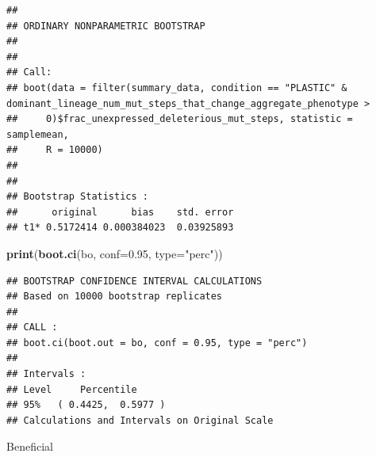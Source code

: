 \documentclass[]{book}
\newenvironment{Shaded}{\begin{snugshade}}{\end{snugshade}}
\newcommand{\DataTypeTok}[1]{\textcolor[rgb]{0.13,0.29,0.53}{#1}}
\newcommand{\DecValTok}[1]{\textcolor[rgb]{0.00,0.00,0.81}{#1}}
\newcommand{\FloatTok}[1]{\textcolor[rgb]{0.00,0.00,0.81}{#1}}
\newcommand{\KeywordTok}[1]{\textcolor[rgb]{0.13,0.29,0.53}{\textbf{#1}}}
\newcommand{\NormalTok}[1]{#1}
\newcommand{\OperatorTok}[1]{\textcolor[rgb]{0.81,0.36,0.00}{\textbf{#1}}}
\newcommand{\StringTok}[1]{\textcolor[rgb]{0.31,0.60,0.02}{#1}}
\begin{document}
\begin{verbatim}
## 
## ORDINARY NONPARAMETRIC BOOTSTRAP
## 
## 
## Call:
## boot(data = filter(summary_data, condition == "PLASTIC" & dominant_lineage_num_mut_steps_that_change_aggregate_phenotype > 
##     0)$frac_unexpressed_deleterious_mut_steps, statistic = samplemean, 
##     R = 10000)
## 
## 
## Bootstrap Statistics :
##      original      bias    std. error
## t1* 0.5172414 0.000384023  0.03925893
\end{verbatim}

\begin{Shaded}
\begin{Highlighting}[]
\KeywordTok{print}\NormalTok{(}\KeywordTok{boot.ci}\NormalTok{(bo, }\DataTypeTok{conf=}\FloatTok{0.95}\NormalTok{, }\DataTypeTok{type=}\StringTok{"perc"}\NormalTok{))}
\end{Highlighting}
\end{Shaded}

\begin{verbatim}
## BOOTSTRAP CONFIDENCE INTERVAL CALCULATIONS
## Based on 10000 bootstrap replicates
## 
## CALL : 
## boot.ci(boot.out = bo, conf = 0.95, type = "perc")
## 
## Intervals : 
## Level     Percentile     
## 95%   ( 0.4425,  0.5977 )  
## Calculations and Intervals on Original Scale
\end{verbatim}

Beneficial

\begin{Shaded}
\end{Shaded}
\end{document}
